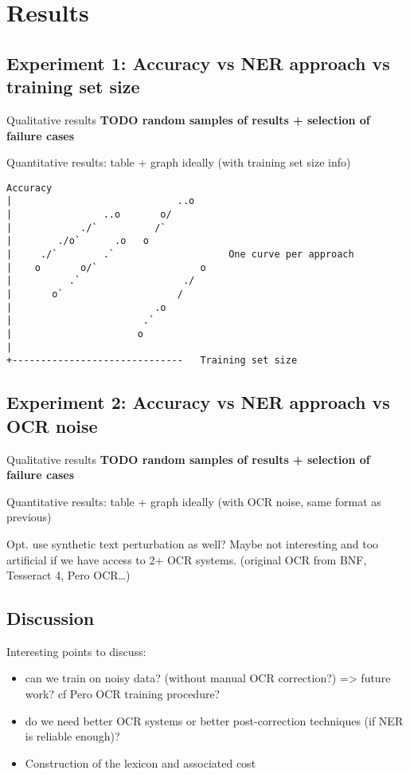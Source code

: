 \section{Results}

\subsection{Experiment 1: Accuracy vs NER approach vs training set size}

Qualitative results
\textbf{TODO random samples of results + selection of failure cases}


Quantitative results: table + graph ideally (with training set size info)

\begin{verbatim}
Accuracy
|                             ..o   
|                ..o       o/       
|            ./`          /`          
|        ./o`      .o   o            
|     ./`        .`                    One curve per approach
|    o       o/`                  o  
|          .`                  ./    
|       o`                    /      
|                         .o        
|                       .`           
|                      o            
|                                   
+------------------------------   Training set size
\end{verbatim}
                                        


\subsection{Experiment 2: Accuracy vs NER approach vs OCR noise}

Qualitative results
\textbf{TODO random samples of results + selection of failure cases}

Quantitative results: table + graph ideally (with OCR noise, same format as previous)

Opt. use synthetic text perturbation as well? Maybe not interesting and too artificial if we have access to 2+ OCR systems.
(original OCR from BNF, Tesseract 4, Pero OCR…)


\subsection{Discussion}
Interesting points to discuss:
\begin{itemize}
    \item can we train on noisy data? (without manual OCR correction?) => future work? cf Pero OCR training procedure?
    \item do we need better OCR systems or better post-correction techniques (if NER is reliable enough)?
    \item Construction of the lexicon and associated cost
\end{itemize}
